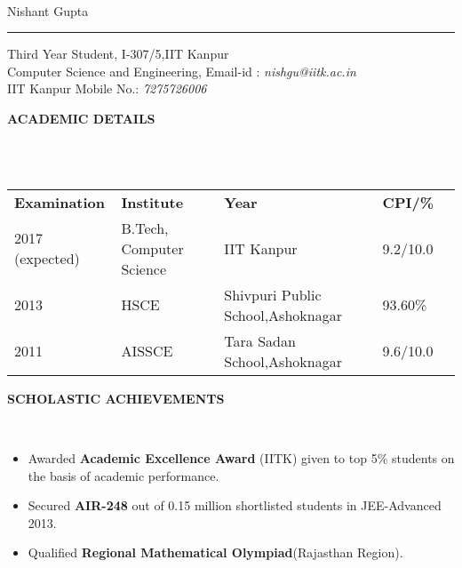 \documentclass[a4paper,10pt]{article}
\newcommand{\lsep}{-0.5cm}
\newcommand{\resheading}[1]{{\small \colorbox{mygrey}{\begin{minipage}{0.975\textwidth}{\textbf{#1 \vphantom{p\^{E}}}}\end{minipage}}}}
\begin{document}
\hspace{0.5cm}\\[-0.2cm]
{\huge Nishant Gupta}\vspace{-1mm} \hrule \vspace{2mm}
\indent Third Year Student,  \hfill {I-307/5,IIT Kanpur}  \\
\indent Computer Science and Engineering, \hfill Email-id : \textit{nishgu@iitk.ac.in}  \\
\indent IIT Kanpur \hfill Mobile No.: \textit{7275726006} \\

\resheading{\textbf{ACADEMIC DETAILS} }\\[\lsep]
\\ \vspace{-2mm}
\begin{center}
  \indent \begin{tabular}{ l @{\hskip 0.15in} l @{\hskip 0.15in} l @{\hskip 0.15in} l @{\hskip 0.15in} l }
            \textbf{Examination}  & \textbf{Institute} & \textbf{Year} & \textbf{CPI/\%} \\
            2017 (expected) & {B.Tech,  Computer Science} & IIT Kanpur  & 9.2/10.0  \\ 
            2013 & {HSCE} & Shivpuri Public School,Ashoknagar & 			93.60\%	\\
            2011 & AISSCE & Tara Sadan School,Ashoknagar  & 9.6/10.0   \\
          \end{tabular}
        \end{center}
\vspace{-0.5mm}
        \resheading{\textbf{SCHOLASTIC ACHIEVEMENTS} }\\[\lsep]
        \begin{itemize} \itemsep -2pt
        \item
          Awarded \textbf{Academic Excellence Award} (IITK) given to top 5\% students on the basis of academic performance.
        \item
          Secured \textbf{AIR-248} out of 0.15
          million shortlisted  students in JEE-Advanced 2013.
        \item
          Qualified \textbf{Regional Mathematical Olympiad}(Rajasthan Region).
        \end{itemize}
\end{document}
